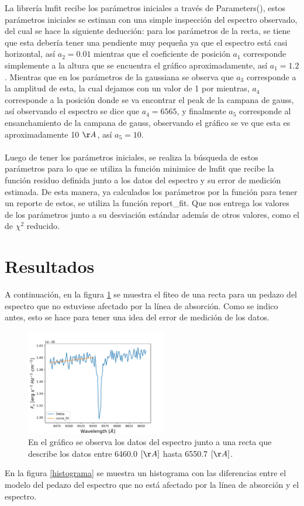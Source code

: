 \documentclass[letterpaper,oneside]{article}
\begin{document}
La librería lmfit recibe los parámetros iniciales a través de Parameters(), estos parámetros iniciales se estiman con una simple inspección del espectro observado, del cual se hace la siguiente deducción: para los parámetros de la recta, se tiene que esta debería tener una pendiente muy pequeña ya que el espectro está casi horizontal, así $a_2 = 0.01$ mientras que el coeficiente de posición $a_1$ corresponde simplemente a la altura que se encuentra el gráfico aproximadamente, así $a_1 = 1.2$. Mientras que en los parámetros de la gaussiana se observa que $a_3$ corresponde a la amplitud de esta, la cual dejamos con un valor de 1 por mientras, $a_4$ corresponde a la posición donde se va encontrar el peak de la campana de gauss, así observando el espectro se dice que $a_4 = 6565$, y finalmente $a_5$ corresponde al ensanchamiento de la campana de gauss, observando el gráfico se ve que esta es aproximadamente 10 $\AA$, así $a_5 = 10$. 
\\ \\
Luego de tener los parámetros iniciales, se realiza la búsqueda de estos parámetros para lo que se utiliza la función minimice de lmfit que recibe la función residuo definida junto a los datos del espectro y su error de medición estimada. De esta manera, ya calculados los parámetros por la función para tener un reporte de estos, se utiliza la función report\_fit. Que nos entrega los valores de los parámetros junto a su desviación estándar además de otros valores, como el de $\chi^2$ reducido. 


\newpage
\section{Resultados}
A continuación, en la figura \ref{recta} se muestra el fiteo de una recta para un pedazo del espectro que no estuviese afectado por la línea de absorción. Como se indico antes, esto se hace para tener una idea del error de medición de los datos.
\begin{figure}
    \centering    
    \includegraphics[width=0.55\textwidth]{Tarea 6/Grafico recta en espectro.pdf}
    \caption{En el gráfico se observa los datos del espectro junto a una recta que describe los datos entre 6460.0 $[\AA]$ hasta 6550.7 $[\AA]$.}
    \label{recta}
\end{figure}{}
En la figura \ref{histograma} se muestra un histograma con las diferencias entre el modelo del pedazo del espectro que no está afectado por la línea de absorción y el espectro.  
\end{document}
